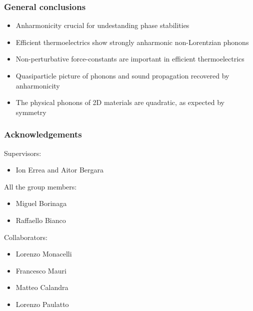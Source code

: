 \documentclass{beamer}
\begin{document}
\begin{frame}

\frametitle{General conclusions}
\begin{itemize}
\item Anharmonicity crucial for undestanding phase stabilities
\item Efficient thermoelectrics show strongly anharmonic non-Lorentzian phonons
\item Non-perturbative force-constants are important in efficient thermoelectrics
\item Quasiparticle picture of phonons and sound propagation recovered by anharmonicity
\item The physical phonons of 2D materials are quadratic, as expected by symmetry
\end{itemize}

\end{frame}


\begin{frame}

\frametitle{Acknowledgements}
Supervisors:
\begin{itemize}
\item Ion Errea and Aitor Bergara
\end{itemize}
All the group members:
\begin{itemize}
\item Miguel Borinaga
\item Raffaello Bianco
\end{itemize}
Collaborators:
\begin{itemize}
\item Lorenzo Monacelli 
\item Francesco Mauri 
\item Matteo Calandra 
\item Lorenzo Paulatto 
\end{itemize}

\end{frame}

\end{document}
